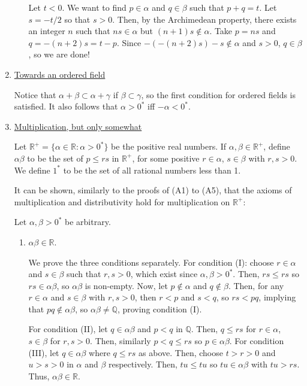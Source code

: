 \documentclass{scrbook}
\newcommand{\Q}{\mathbb{Q}}
\newcommand{\R}{\mathbb{R}}
\renewcommand{\underline}{\ul}
\begin{document}
\begin{enumerate}[Step 1.]
\begin{enumerate}[({A}1)]
Let $t < 0$. We want to find $p \in \alpha$ and $q \in \beta$ such that $p + q = t$. Let $s = -t/2$ so that $s > 0$. Then, by the Archimedean property, there exists an integer $n$ such that $ns \in \alpha$ but $(n + 1)s \not\in \alpha$. Take $p = ns$ and $q = -(n + 2)s = t - p$. Since $-(-(n + 2)s) - s \not\in \alpha$ and $s > 0$, $q \in \beta$, so we are done!

\end{enumerate}

\item \underline{Towards an ordered field}

Notice that $\alpha + \beta \subset \alpha + \gamma$ if $\beta \subset \gamma$, so the first condition for ordered fields is satisfied. It also follows that $\alpha > 0^*$ iff $-\alpha < 0^*$. 

\item \underline{Multiplication, but only somewhat}

Let $\R^+ = \{\alpha \in \R : \alpha > 0^*\}$ be the positive real numbers. If $\alpha, \beta \in \R^+$, define $\alpha\beta$ to be the set of $p \le rs$ in $\R^+$, for some positive $r \in \alpha$, $s \in \beta$ with $r, s > 0$. We define $1^*$ to be the set of all rational numbers less than 1.

It can be shown, similarly to the proofs of (A1) to (A5), that the axioms of multiplication and distributivity hold for multiplication on $\R^+$:

Let $\alpha, \beta > 0^*$ be arbitrary.
\begin{enumerate}[({M}1)]
\item $\alpha \beta \in \R$.

We prove the three conditions separately. For condition (I): choose $r \in \alpha$ and $s \in \beta$ such that $r, s > 0$, which exist since $\alpha, \beta > 0^*$. Then, $rs \le rs$ so $rs \in \alpha\beta$, so $\alpha\beta$ is non-empty. Now, let $p \not\in \alpha$ and $q \not\in \beta$. Then, for any $r \in \alpha$ and $s \in \beta$ with $r, s > 0$, then $r < p$ and $s < q$, so $rs < pq$, implying that $pq \not\in \alpha\beta$, so $\alpha\beta \ne \Q$, proving condition (I).

For condition (II), let $q \in \alpha\beta$ and $p < q$ in $\Q$. Then, $q \le rs$ for $r \in \alpha$, $s \in \beta$ for $r, s > 0$. Then, similarly $p < q \le rs$ so $p \in \alpha\beta$. For condition (III), let $q \in \alpha\beta$ where $q \le rs$ as above. Then, choose $t > r > 0$ and $u > s > 0$ in $\alpha$ and $\beta$ respectively. Then, $tu \le tu$ so $tu \in \alpha\beta$ with $tu > rs$. Thus, $\alpha\beta \in \R$.


\end{enumerate}
\end{enumerate}
\end{document}
